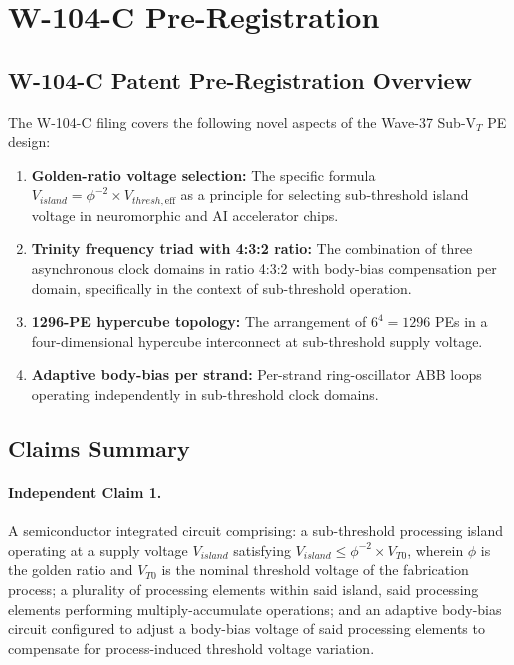 \section{W-104-C Pre-Registration}
\label{sec:w104c}

\subsection{W-104-C Patent Pre-Registration Overview}

The W-104-C filing covers the following novel aspects of the Wave-37 Sub-V$_T$ PE design:
\begin{enumerate}
  \item \textbf{Golden-ratio voltage selection:} The specific formula
        $V_{island} = \phi^{-2} \times V_{thresh,\text{eff}}$ as a principle for
        selecting sub-threshold island voltage in neuromorphic and AI accelerator chips.
  \item \textbf{Trinity frequency triad with 4:3:2 ratio:} The combination of three
        asynchronous clock domains in ratio 4:3:2 with body-bias compensation per domain,
        specifically in the context of sub-threshold operation.
  \item \textbf{1296-PE hypercube topology:} The arrangement of $6^4 = 1296$ PEs in a
        four-dimensional hypercube interconnect at sub-threshold supply voltage.
  \item \textbf{Adaptive body-bias per strand:} Per-strand ring-oscillator ABB loops
        operating independently in sub-threshold clock domains.
\end{enumerate}

\subsection{Claims Summary}

\paragraph{Independent Claim 1.} A semiconductor integrated circuit comprising: a
sub-threshold processing island operating at a supply voltage $V_{island}$ satisfying
$V_{island} \leq \phi^{-2} \times V_{T0}$, wherein $\phi$ is the golden ratio and $V_{T0}$
is the nominal threshold voltage of the fabrication process; a plurality of processing
elements within said island, said processing elements performing multiply-accumulate
operations; and an adaptive body-bias circuit configured to adjust a body-bias voltage
of said processing elements to compensate for process-induced threshold voltage variation.

